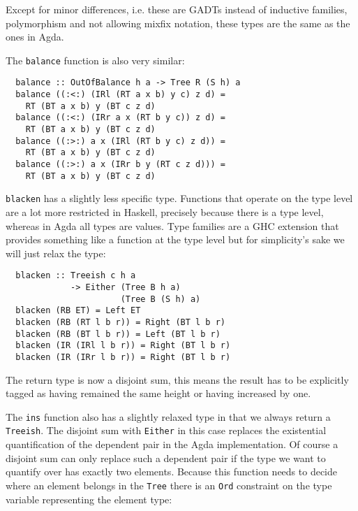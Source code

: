 \documentclass[journal, retainorgcmds]{IEEEtran}
\newcommand{\ihask}[1]{\texttt{#1}}
\begin{document}
Except for minor differences, i.e. these are GADTs instead of inductive
families, polymorphism and not allowing mixfix notation, these types are the
same as the ones in Agda.

The \ihask{balance} function is also very similar:

\begin{verbatim}
  balance :: OutOfBalance h a -> Tree R (S h) a
  balance ((:<:) (IRl (RT a x b) y c) z d) =
    RT (BT a x b) y (BT c z d)
  balance ((:<:) (IRr a x (RT b y c)) z d) =
    RT (BT a x b) y (BT c z d)
  balance ((:>:) a x (IRl (RT b y c) z d)) =
    RT (BT a x b) y (BT c z d)
  balance ((:>:) a x (IRr b y (RT c z d))) =
    RT (BT a x b) y (BT c z d)
\end{verbatim}

\ihask{blacken} has a slightly less specific type.
Functions that operate on the type level are a lot more restricted in Haskell,
precisely because there is a type level, whereas in Agda all types are values.
Type families \cite{typefam} are a GHC extension that provides something like a
function at the type level but for simplicity's sake we will just relax the
type:

\begin{verbatim}
  blacken :: Treeish c h a
             -> Either (Tree B h a)
                       (Tree B (S h) a)
  blacken (RB ET) = Left ET
  blacken (RB (RT l b r)) = Right (BT l b r)
  blacken (RB (BT l b r)) = Left (BT l b r)
  blacken (IR (IRl l b r)) = Right (BT l b r)
  blacken (IR (IRr l b r)) = Right (BT l b r)
\end{verbatim}

The return type is now a disjoint sum, this means the result has to be
explicitly tagged as having remained the same height or having increased by
one.

The \ihask{ins} function also has a slightly relaxed type in that we always
return a \ihask{Treeish}.
The disjoint sum with \ihask{Either} in this case replaces the existential
quantification of the dependent pair in the Agda implementation.
Of course a disjoint sum can only replace such a dependent pair if the type we
want to quantify over has exactly two elements.
Because this function needs to decide where an element belongs in the
\ihask{Tree} there is an \ihask{Ord} constraint on the type variable
representing the element type:
\end{document}
